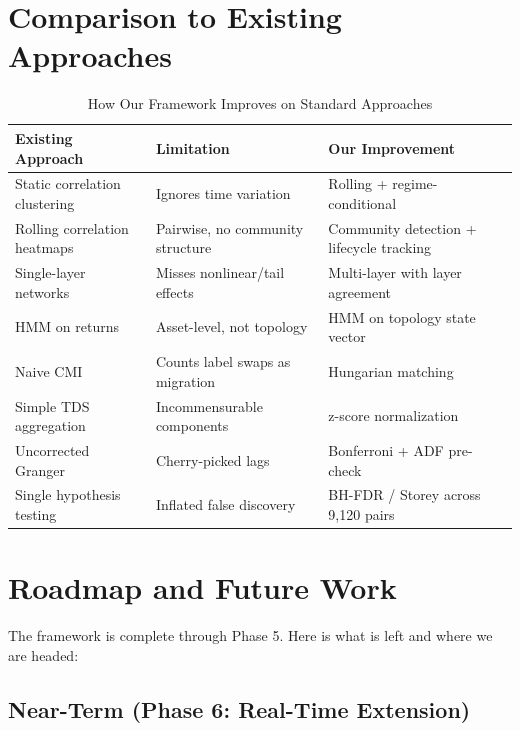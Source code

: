 \documentclass[12pt, letterpaper]{article}
\begin{document}
\section{Comparison to Existing Approaches}

\begin{table}[H]
\centering
\caption{How Our Framework Improves on Standard Approaches}
\begin{tabular}{@{}p{4cm}p{4cm}p{5cm}@{}}
\toprule
\textbf{Existing Approach} & \textbf{Limitation} & \textbf{Our Improvement} \\
\midrule
Static correlation clustering & Ignores time variation & Rolling + regime-conditional \\
Rolling correlation heatmaps & Pairwise, no community structure & Community detection + lifecycle tracking \\
Single-layer networks & Misses nonlinear/tail effects & Multi-layer with layer agreement \\
HMM on returns & Asset-level, not topology & HMM on topology state vector \\
Naive CMI & Counts label swaps as migration & Hungarian matching \\
Simple TDS aggregation & Incommensurable components & z-score normalization \\
Uncorrected Granger & Cherry-picked lags & Bonferroni + ADF pre-check \\
Single hypothesis testing & Inflated false discovery & BH-FDR / Storey across 9,120 pairs \\
\bottomrule
\end{tabular}
\end{table}

\section{Roadmap and Future Work}

The framework is complete through Phase 5. Here is what is left and where we are headed:

\subsection{Near-Term (Phase 6: Real-Time Extension)}
\end{document}
